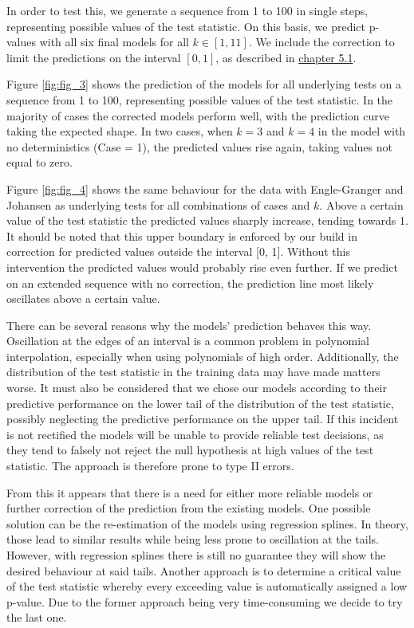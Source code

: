 \documentclass[12pt,a4paper]{article}
\begin{document}
In order to test this, we generate a sequence from 1 to 100 in single
steps, representing possible values of the test statistic. On this
basis, we predict p-values with all six final models for all
\(k \in [1, 11]\). We include the correction to limit the predictions on
the interval \([0, 1]\), as described in
\protect\hyperlink{rmse-comparison}{chapter 5.1}.

Figure \ref{fig:fig_3} shows the prediction of the models for all
underlying tests on a sequence from 1 to 100, representing possible
values of the test statistic. In the majority of cases the corrected
models perform well, with the prediction curve taking the expected
shape. In two cases, when \(k = 3\) and \(k = 4\) in the model with no
deterministics (Case = 1), the predicted values rise again, taking
values not equal to zero.

Figure \ref{fig:fig_4} shows the same behaviour for the data with
Engle-Granger and Johansen as underlying tests for all combinations of
cases and \(k\). Above a certain value of the test statistic the
predicted values sharply increase, tending towards 1. It should be noted
that this upper boundary is enforced by our build in correction for
predicted values outside the interval {[}0, 1{]}. Without this
intervention the predicted values would probably rise even further. If
we predict on an extended sequence with no correction, the prediction
line most likely oscillates above a certain value.

There can be several reasons why the models' prediction behaves this
way. Oscillation at the edges of an interval is a common problem in
polynomial interpolation, especially when using polynomials of high
order. Additionally, the distribution of the test statistic in the
training data may have made matters worse. It must also be considered
that we chose our models according to their predictive performance on
the lower tail of the distribution of the test statistic, possibly
neglecting the predictive performance on the upper tail. If this
incident is not rectified the models will be unable to provide reliable
test decisions, as they tend to falsely not reject the null hypothesis
at high values of the test statistic. The approach is therefore prone to
type II errors.

From this it appears that there is a need for either more reliable
models or further correction of the prediction from the existing models.
One possible solution can be the re-estimation of the models using
regression splines. In theory, those lead to similar results while being
less prone to oscillation at the tails. However, with regression splines
there is still no guarantee they will show the desired behaviour at said
tails. Another approach is to determine a critical value of the test
statistic whereby every exceeding value is automatically assigned a low
p-value. Due to the former approach being very time-consuming we decide
to try the last one.
\end{document}
